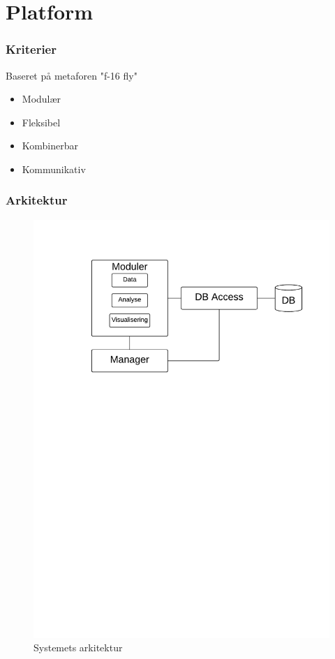 \section{Platform}

\begin{frame}
\frametitle{Kriterier}
Baseret på metaforen "f-16 fly"
\begin{itemize}
\item Modulær
\item Fleksibel
\item Kombinerbar
\item Kommunikativ
\end{itemize}
\end{frame}

\begin{frame}
\frametitle{Arkitektur}
\begin{figure}[h]
	\centering						%
	\includegraphics[scale=0.5, trim = 1cm 17.5cm 1cm 1cm, clip]{../grafik/ArkitekturLucidChart}
	\caption{Systemets arkitektur}
  \label{arkitektur_udkast_1}
\end{figure}
\end{frame}

